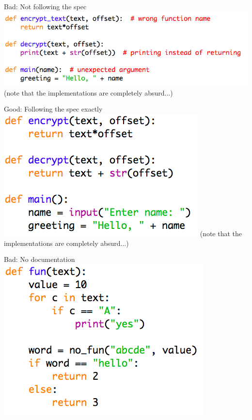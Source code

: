 \documentclass[week2]{csse1001}
\begin{document}
\begin{topic}{Bad: Not following the spec}
\includegraphics[height=\textheight]{bad_python/incorrect}
(note that the implementations are completely absurd...)
\end{topic}

\begin{topic}{Good: Following the spec exactly}
\includegraphics[height=\textheight]{bad_python/correct}
(note that the implementations are completely absurd...)
\end{topic}

\begin{topic}{Bad: No documentation}
\includegraphics[height=\textheight]{bad_python/no_comments}
\end{topic}
\end{document}

